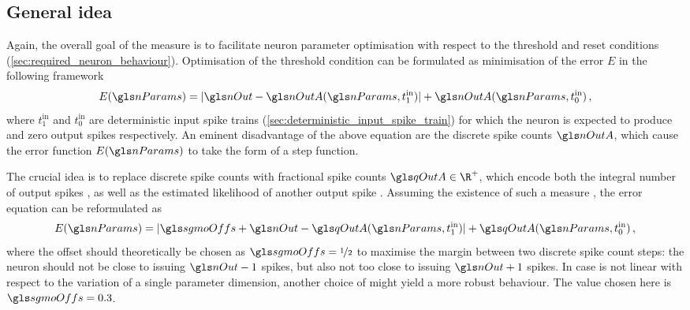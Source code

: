 \subsection{General idea}
\label{sec:sgmo_measure_idea}

Again, the overall goal of the measure is to facilitate neuron parameter optimisation with respect to the threshold and reset conditions (\cref{sec:required_neuron_behaviour}). Optimisation of the threshold condition can be formulated as minimisation of the error $E$ in the following framework
\begin{align}
	E(\nParams) = | \nOut - \nOutA(\nParams, t^\mathrm{in}_1) | + \nOutA(\nParams, t^\mathrm{in}_0)\,,
\end{align}
where $t^\mathrm{in}_1$ and $t^\mathrm{in}_0$ are deterministic input spike trains (\cref{sec:deterministic_input_spike_train}) for which the neuron is expected to produce \nOut and zero output spikes respectively. An eminent disadvantage of the above equation are the discrete spike counts $\nOutA$, which cause the error function $E(\nParams)$ to take the form of a step function.

The crucial idea is to replace discrete spike counts \nOutA with fractional spike counts $\qOutA \in \R^+$, which encode both the integral number of output spikes \nOutA, as well as the estimated likelihood of another output spike \pOutA. Assuming the existence of such a measure \qOutA, the error equation can be reformulated as
\begin{align}
	E(\nParams) = | \sgmoOffs + \nOut - \qOutA(\nParams, t^\mathrm{in}_1) | + \qOutA(\nParams, t^\mathrm{in}_0)\,,
\end{align}
where the offset \sgmoOffs should theoretically be chosen as $\sgmoOffs = \nicefrac{1}2$ to maximise the margin between two discrete spike count steps: the neuron should not be close to issuing $\nOut - 1$ spikes, but also not too close to issuing $\nOut + 1$ spikes. In case \qOutA is not linear with respect to the variation of a single parameter dimension, another choice of \sgmoOffs might yield a more robust behaviour. The value chosen here is $\sgmoOffs = 0.3$.

